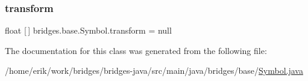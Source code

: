 \subsubsection{\texorpdfstring{transform}{transform}}
{\footnotesize\ttfamily float \mbox{[}$\,$\mbox{]} bridges.\+base.\+Symbol.\+transform = null\hspace{0.3cm}{\ttfamily [protected]}}



The documentation for this class was generated from the following file\+:\begin{DoxyCompactItemize}
\item 
/home/erik/work/bridges/bridges-\/java/src/main/java/bridges/base/\hyperlink{_symbol_8java}{Symbol.\+java}\end{DoxyCompactItemize}
